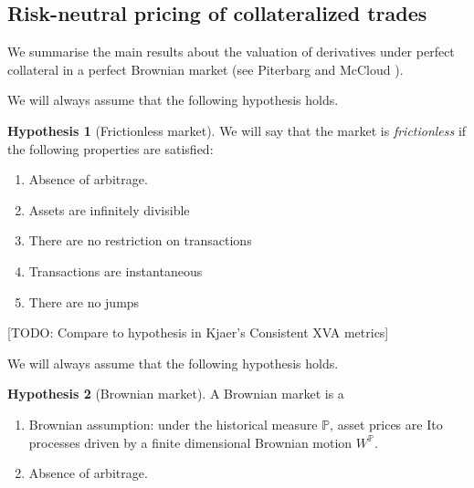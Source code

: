 \documentclass[11pt,english]{amsart}
\newcommand{\PP}{\mathbb{P}}
\theoremstyle{definition}
\newtheorem*{hypo}{Hypothesis}
\begin{document}
\subsection{Risk-neutral pricing of collateralized trades}\label{ssec:rn_pricing}

We summarise the main results about the valuation of derivatives under perfect collateral in a perfect Brownian market (see Piterbarg \cite{Piterbarg:Cooking} and McCloud \cite{McCloud:CollateralVolatility}).

We will always assume that the following hypothesis holds. 
\begin{hypo}[Frictionless market]
We will say that the market is \emph{frictionless} if the following properties are satisfied:
\begin{enumerate} 
\item Absence of arbitrage.
\item Assets are infinitely divisible
\item There are no restriction on transactions 
\item Transactions are instantaneous
\item There are no jumps 
\end{enumerate}
\end{hypo}

[TODO: Compare to hypothesis in Kjaer's Consistent XVA metrics]

We will always assume that the following hypothesis holds. 
\begin{hypo}[Brownian market]
A Brownian market is a 
\begin{enumerate} 
\item Brownian assumption: under the historical measure $\PP$, asset prices are Ito processes driven by a finite dimensional Brownian motion $W^\PP$. 
\item Absence of arbitrage.
\end{enumerate}
\end{hypo}
\end{document}
